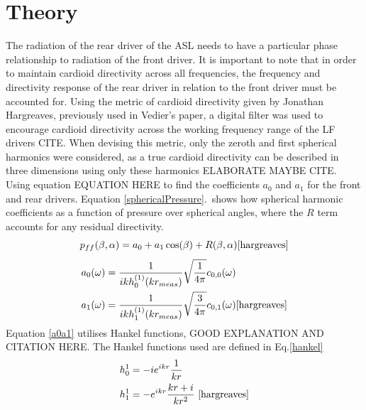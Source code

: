 \documentclass{report}
\begin{document}
        \section{Theory}
            The radiation of the rear driver of the ASL needs to have a particular phase relationship to radiation of the front driver.
            It is important to note that in order to maintain cardioid directivity across all frequencies, the frequency and directivity response of the rear driver in relation to the front driver must be accounted for.
            Using the metric of cardioid directivity given by Jonathan Hargreaves, previously used in Vedier's paper, a digital filter was used to encourage cardioid directivity across the working frequency range of the LF drivers CITE.
            When devising this metric, only the zeroth and first spherical harmonics were considered, as a true cardioid directivity can be described in three dimensions using only these harmonics ELABORATE MAYBE CITE.
            Using equation EQUATION HERE to find the coefficients $a_0$ and $a_1$ for the front and rear drivers.
            Equation \ref{sphericalPressure}.\ shows how spherical harmonic coefficients as a function of pressure over spherical angles, where the $R$ term accounts for any residual directivity.
            \begin{equation}
                p_{ff}(\beta,\alpha) = a_0 + a_1 \cos(\beta) + R(\beta,\alpha)
                \label{sphericalPressure}
                \cite{hargreaves}
            \end{equation}
            \begin{equation}
                \begin{split}
                    a_0(\omega) &= \frac{1}{ikh_0^{(1)}(kr_{meas})} \sqrt{\frac{1}{4\pi}} c_{0,0}(\omega) \\
                    a_1(\omega) &= \frac{1}{ikh_1^{(1)}(kr_{meas})} \sqrt{\frac{3}{4\pi}} c_{0,1}(\omega)
                    \label{a0a1}
                    \cite{hargreaves}
                \end{split}
            \end{equation}
            Equation \ref{a0a1} utilises Hankel functions, GOOD EXPLANATION AND CITATION HERE.
            The Hankel functions used are defined in Eq.\ref{hankel}
            \begin{equation}
                \begin{split}
                    h_0^1 &= -i  e^{ikr}  \frac{1}{kr} \\
                    h_1^1 &= -e^{ikr}  \frac{kr + i}{kr^2} ~\cite{hargreaves}
                    \label{hankel}
                \end{split}
            \end{equation}
            
\end{document}
